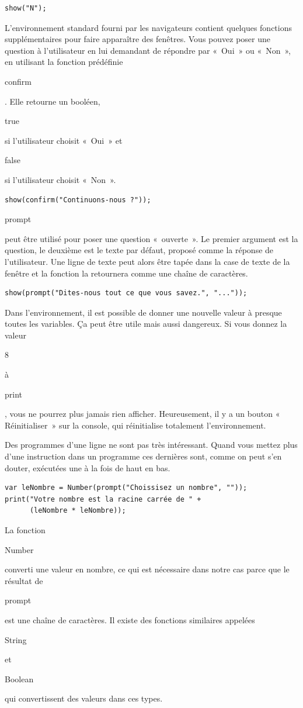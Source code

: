 \documentclass{FramateX}
\renewcommand{\texttt}[1]{\begin{sffamily}{#1}\end{sffamily}}
\begin{document}
\begin{lstlisting}
show("N");
\end{lstlisting}
L'environnement standard fourni par les navigateurs contient quelques
fonctions supplémentaires pour faire apparaître des fenêtres. Vous
pouvez poser une question à l'utilisateur en lui demandant de répondre
par «~Oui~» ou «~Non~», en utilisant la fonction prédéfinie
\texttt{confirm}. Elle retourne un booléen, \texttt{true} si
l'utilisateur choisit «~Oui~» et \texttt{false} si l'utilisateur choisit
«~Non~».

\begin{lstlisting}
show(confirm("Continuons-nous ?"));
\end{lstlisting}
\texttt{prompt} peut être utilisé pour poser une question «~ouverte~».
Le premier argument est la question, le deuxième est le texte par
défaut, proposé comme la réponse de l'utilisateur. Une ligne de texte
peut alors être tapée dans la case de texte de la fenêtre et la fonction
la retournera comme une chaîne de caractères.

\begin{lstlisting}
show(prompt("Dites-nous tout ce que vous savez.", "..."));
\end{lstlisting}
\begin{center}\end{center}

Dans l'environnement, il est possible de donner une nouvelle valeur à
presque toutes les variables. Ça peut être utile mais aussi dangereux.
Si vous donnez la valeur \texttt{8} à \texttt{print}, vous ne pourrez
plus jamais rien afficher. Heureusement, il y a un bouton «
Réinitialiser~» sur la console, qui réinitialise totalement
l'environnement.

\begin{center}\end{center}

Des programmes d'une ligne ne sont pas très intéressant. Quand vous
mettez plus d'une instruction dans un programme ces dernières sont,
comme on peut s'en douter, exécutées une à la fois de haut en bas.

\begin{lstlisting}
var leNombre = Number(prompt("Choissisez un nombre", ""));
print("Votre nombre est la racine carrée de " +
      (leNombre * leNombre));
\end{lstlisting}
La fonction \texttt{Number} converti une valeur en nombre, ce qui est
nécessaire dans notre cas parce que le résultat de \texttt{prompt} est
une chaîne de caractères. Il existe des fonctions similaires appelées
\texttt{String} et \texttt{Boolean} qui convertissent des valeurs dans
ces types.
\end{document}
